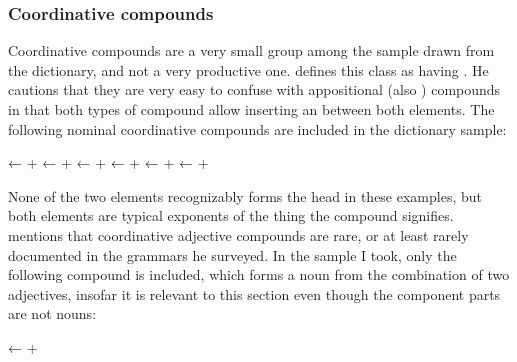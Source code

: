 
\subsubsection{Coordinative compounds}

Coordinative compounds are a very small group among the sample drawn from the 
dictionary, and not a very productive one. \citet{bauer2001} defines this class 
as having . He cautions that they are very easy to 
confuse with appositional (also ) compounds in that both types 
of compound allow inserting an  between both elements. The following 
nominal coordinative compounds are included in the dictionary sample:

\pex
	\a {}
		← 
		+ 
	\a {}
		← 
		+ 
	\a {}
		← 
		+ 
	\a {}
		← 
		+ 
	\a {}
		← 
		+ 
	\a {}
		← 
		+ 
\xe

None of the two elements recognizably forms the head in these examples, but 
both elements are typical exponents of the thing the compound signifies. 
\citet[699]{bauer2001} mentions that coordinative adjective compounds are rare, 
or at least rarely documented in the grammars he surveyed. In the sample I 
took, only the following compound is included, which forms a noun from the 
combination of two adjectives, insofar it is relevant to this section even 
though the component parts are not nouns:

\ex
		← 
		+ 
\xe

